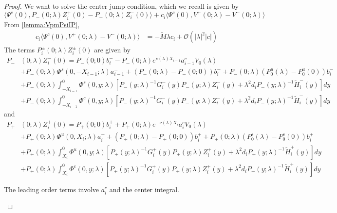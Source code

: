 \documentclass[thesis.tex]{subfiles}
\begin{document}
\begin{lemma}
\begin{proof}
We want to solve the center jump condition, which we recall is given by
\[
\langle \Psi^c(0), P_-(0; \lambda) Z_i^+(0) - P_-(0; \lambda) Z_i^-(0) \rangle + c_i \langle \Psi^c(0), V^+(0; \lambda) - V^-(0; \lambda) \rangle 
\]
From \cref{lemma:VpmPsiIP},
\begin{align}\label{centerVjump}
c_i \langle \Psi^c(0), V^+(0; \lambda) - V^-(0; \lambda) \rangle &= -\tilde{M} \lambda c_i + \mathcal{O}(|\lambda|^2 |c| )
\end{align}
The terms $P_i^\pm(0; \lambda) Z_i^\pm(0)$ are given by
\begin{align*}
P_-&(0; \lambda) Z_i^-(0) = P_-(0; 0) b_i^- - P_-(0; \lambda) e^{\nu(\lambda) X_{i-1}} a_{i-1}^c V_0(\lambda) \\
&+ P_-(0; \lambda) \Phi^s(0, -X_{i-1}; \lambda) a_{i-1}^- + (P_-(0; \lambda) - P_-(0; 0))b_i^- + P_-(0; \lambda)(P_0^u(\lambda) - P_0^u(0))b_i^- \\
&+ P_-(0; \lambda) \int_{-X_{i-1}}^0 \Phi^s(0, y; \lambda) [P_-(y; \lambda)^{-1} G_i^-(y) P_-(y; \lambda)Z_i^-(y) + \lambda^2 d_i P_-(y; \lambda)^{-1} \tilde{H}_i^-(y)] dy \\
&+ P_-(0; \lambda) \int_{-X_{i-1}}^0 \Phi^c(0, y; \lambda) [P_-(y; \lambda)^{-1} G_i^-(y) P_-(y; \lambda)Z_i^-(y) + \lambda^2 d_i P_-(y; \lambda)^{-1} \tilde{H}_i^-(y)] dy
\end{align*}
and
\begin{align*}
P_+&(0; \lambda) Z_i^+(0) = P_+(0; 0) b_i^+ + P_+(0; \lambda) e^{-\nu(\lambda)X_i} a_i^c V_0(\lambda) \\
&+ P_+(0; \lambda) \Phi^u(0, X_i; \lambda) a_i^+ + (P_+(0; \lambda) - P_+(0; 0)) b_i^+ + P_+(0; \lambda) (P_0^s(\lambda) - P_0^s(0)) b_i^+ \\
&+ P_+(0; \lambda) \int_{X_i}^0 \Phi^u(0, y; \lambda) [P_+(y; \lambda)^{-1} G_i^+(y) P_+(y; \lambda) Z_i^+(y) + \lambda^2 d_i P_+(y; \lambda)^{-1} \tilde{H}_i^+(y)] dy \\
&+ P_+(0; \lambda) \int_{X_i}^0 \Phi^c(0, y; \lambda) [P_+(y; \lambda)^{-1} G_i^+(y) P_+(y; \lambda) Z_i^+(y) + \lambda^2 d_i P_+(y; \lambda)^{-1} \tilde{H}_i^+(y)] dy 
\end{align*}

The leading order terms involve $a_i^c$ and the center integral. 
\begin{enumerate}


\end{enumerate}
\end{proof}
\end{lemma}
\end{document}
